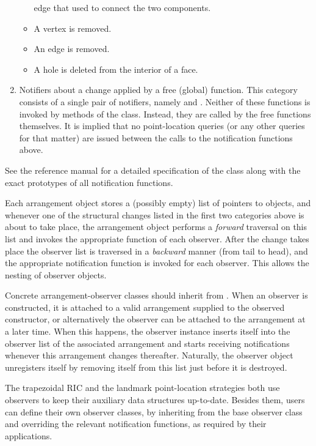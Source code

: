 \begin{enumerate}
\begin{itemize}
edge that used to connect the two components.
\item A vertex is removed.
\item An edge is removed.
\item A hole is deleted from the interior of a face.
\end{itemize}
\item Notifiers about a change applied by a free (global) function.
This category consists of a single pair of notifiers, namely
 and . Neither of
these functions is invoked by methods of the  class. 
Instead, they are called by the free functions themselves. It is implied 
that no point-location queries (or any other queries for that matter)
are issued between the calls to the notification functions above.
\end{enumerate}
See the reference manual for a detailed specification of the
 class along with the exact prototypes of all
notification functions.

Each arrangement object stores a (possibly empty) list of pointers to
 objects, and whenever one of the structural
changes listed in the first two categories above is about to take
place, the arrangement object performs a {\em forward} traversal
on this list and invokes the appropriate function of each
observer. After the change takes place the observer list is
traversed in a {\em backward} manner (from tail to head), and the
appropriate notification function is invoked for each observer.
This allows the nesting of observer objects.

Concrete arrangement-observer classes should inherit from
. When an observer is constructed, it is attached to
a valid arrangement supplied to the observed constructor, or alternatively 
the observer can be attached to the arrangement at a later time.
When this happens, the observer instance inserts itself into the
observer list of the associated arrangement and starts receiving
notifications whenever this arrangement changes thereafter. Naturally,
the observer object unregisters itself by removing itself from
this list just before it is destroyed.

The trapezoidal RIC and the landmark point-location strategies
both use observers to keep their auxiliary data structures
up-to-date. Besides them, users can define their own observer
classes, by inheriting from the base observer class and overriding
the relevant notification functions, as required by their
applications.

